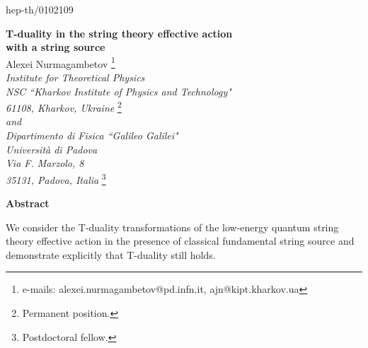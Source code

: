 \documentclass[a4paper,11pt]{article}
\begin{document}
\def\a{\alpha}\def\b{\beta}\def\g{\gamma}\def\d{\delta}\def\e{\epsilon}
\def\k{\kappa}\def\l{\lambda}\def\L{\Lambda}\def\s{\sigma}\def\S{\Sigma}
\def\Th{\Theta}\def\th{\theta}\def\om{\omega}\def\Om{\Omega}\def\G{\Gamma}
\def\y{\vartheta}\def\m{\mu}\def\n{\nu}
\def\ws{worldsheet}
\def\susy{supersymmetry}
\def\ts{target superspace}
\def\ks{$\k$--symmetry}
\newcommand{\plabel}{\label}
\renewcommand\baselinestretch{1.5}
\newcommand{\nn}{\nonumber\\}\newcommand{\p}[1]{(\ref{#1})}
\renewcommand{\thefootnote}{\arabic{footnote}}

\thispagestyle{empty}

\begin{flushright}
hep-th/0102109
\end{flushright}

\vspace*{1cm}
\begin{center}
{\Large \bf  T-duality in the string theory effective action
\\ with a string source
}
\vspace*{2cm}
\\
Alexei Nurmagambetov
\footnote{e-mails:
alexei.nurmagambetov@pd.infn.it, ajn@kipt.kharkov.ua}\\
\vspace{0.5cm}
{\it Institute for Theoretical Physics}\\
{\it NSC ``Kharkov Institute of Physics
and Technology"}\\
{\it 61108, Kharkov, Ukraine}
\footnote{Permanent position.}
\\ 
{\it and}\\
{\it Dipartimento di Fisica ``Galileo Galilei"}\\
{\it Universit\`a di Padova}\\
{\it Via F. Marzolo, 8}\\
{\it 35131, Padova, Italia}
\footnote{Postdoctoral fellow.}
\\ \bigskip




\vspace{1.5cm}
{\bf Abstract}
\end{center}

\noindent
We consider the T-duality transformations of the low-energy quantum
string theory effective action in the presence of classical fundamental 
string source and demonstrate explicitly that T-duality still holds.
\end{document}
